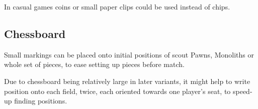 In casual games coins or small paper clips could be used instead of chips.

\subsection*{Chessboard}
\label{sec:Remarks/Chessboard}

Small markings can be placed onto initial positions of scout Pawns, Monoliths
or whole set of pieces, to ease setting up pieces before match.

Due to chessboard being relatively large in later variants, it might help to
write  position onto each field, twice, each oriented towards one
player's seat, to speed-up finding positions.

\clearpage %
